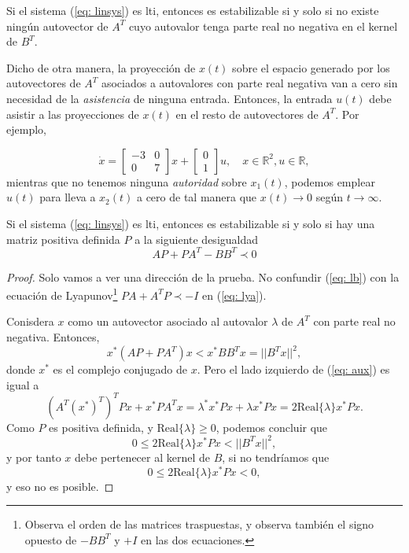 \begin{theorem}
	Si el sistema (\ref{eq: linsys}) es lti, entonces es estabilizable si y solo si no existe ningún autovector de $A^T$ cuyo autovalor tenga parte real no negativa en el kernel de $B^T$.
\end{theorem}

Dicho de otra manera, la proyección de $x(t)$ sobre el espacio generado por los autovectores de $A^T$ asociados a autovalores con parte real negativa van a cero sin necesidad de la \emph{asistencia} de ninguna entrada. Entonces, la entrada $u(t)$ debe asistir a las proyecciones de $x(t)$ en el resto de autovectores de $A^T$. Por ejemplo,

\begin{equation}
	\dot x = \begin{bmatrix}-3 & 0 \\ 0 & 7\end{bmatrix}x + \begin{bmatrix}0 \\ 1\end{bmatrix}u, \quad x\in\mathbb{R}^2, u\in\mathbb{R},
\end{equation}
mientras que no tenemos ninguna \emph{autoridad} sobre $x_1(t)$, podemos emplear $u(t)$ para lleva a $x_2(t)$ a cero de tal manera que $x(t)\to 0$ según $t\to\infty$.
\begin{theorem}
	Si el sistema (\ref{eq: linsys}) es lti, entonces es estabilizable si y solo si hay una matriz positiva definida $P$ a la siguiente desigualdad
	\begin{equation}
	AP + PA^T - BB^T \prec 0
		\label{eq: lb}
	\end{equation}
\end{theorem}
\begin{proof}
	Solo vamos a ver una dirección de la prueba. No confundir (\ref{eq: lb}) con la ecuación de Lyapunov\footnote{Observa el orden de las matrices traspuestas, y observa también el signo opuesto de $-BB^T$ y $+I$ en las dos ecuaciones.} $PA+A^TP \prec -I$ en (\ref{eq: lya}).

Conisdera $x$ como un autovector asociado al autovalor $\lambda$ de $A^T$ con parte real no negativa. Entonces,
	\begin{equation}
	x^*(AP+PA^T)x < x^*BB^Tx = ||B^Tx||^2,
		\label{eq: aux}
	\end{equation}
	donde $x^*$ es el complejo conjugado de $x$. Pero el lado izquierdo de (\ref{eq: aux}) es igual a 
	\begin{equation}
		(A^T(x^*)^T)^TPx + x^*PA^Tx = \lambda^*x^*Px + \lambda x^*Px = 2\text{Real}\{\lambda\}x^*Px.
	\end{equation}
	Como $P$ es positiva definida, y $\text{Real}\{\lambda\} \geq 0$, podemos concluir que 
\begin{equation}
0 \leq 2\text{Real}\{\lambda\}x^*Px < ||B^Tx||^2,
\end{equation}
y por tanto $x$ debe pertenecer al kernel de $B$, si no tendríamos que 
\begin{equation}
0 \leq 2\text{Real}\{\lambda\}x^*Px < 0,
\end{equation}
y eso no es posible.
\end{proof}

